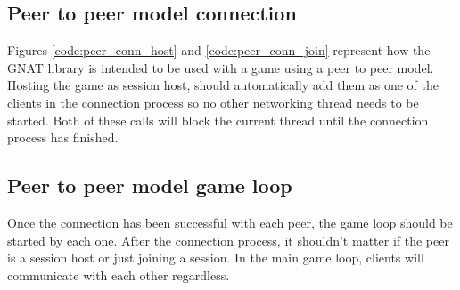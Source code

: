 


\newpage
\subsection{Peer to peer model connection}
Figures \ref{code:peer_conn_host} and \ref{code:peer_conn_join} represent how the GNAT library is intended to be used with a game using a peer to peer model. Hosting the game as session host, should automatically add them as one of the clients in the connection process so no other networking thread needs to be started. Both of these calls will block the current thread until the connection process has finished.




\newpage
\subsection{Peer to peer model game loop}
Once the connection has been successful with each peer, the game loop should be started by each one. After the connection process, it shouldn't matter if the peer is a session host or just joining a session. In the main game loop, clients will communicate with each other regardless.



